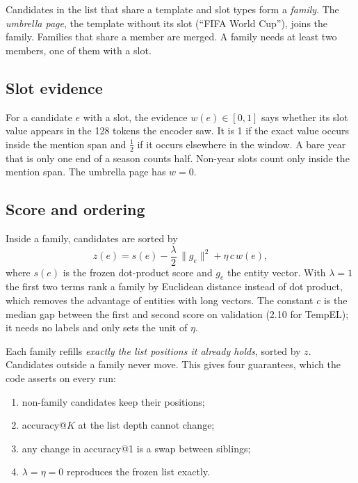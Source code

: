 \documentclass[conference]{IEEEtran}
\begin{document}
Candidates in the list that share a template and slot types form a \emph{family}. The \emph{umbrella
page}, the template without its slot (``FIFA World Cup''), joins the family. Families that share a
member are merged. A family needs at least two members, one of them with a slot.

\subsection{Slot evidence}

For a candidate $e$ with a slot, the evidence $w(e) \in [0,1]$ says whether its slot value appears in
the 128 tokens the encoder saw. It is 1 if the exact value occurs inside the mention span and
$\tfrac12$ if it occurs elsewhere in the window. A bare year that is only one end of a season counts
half. Non-year slots count only inside the mention span. The umbrella page has $w = 0$.

\subsection{Score and ordering}

Inside a family, candidates are sorted by
\begin{equation}
z(e) = s(e) - \frac{\lambda}{2}\,\lVert g_e \rVert^2 + \eta\, c\, w(e),
\label{eq:z}
\end{equation}
where $s(e)$ is the frozen dot-product score and $g_e$ the entity vector. With $\lambda = 1$ the first
two terms rank a family by Euclidean distance instead of dot product, which removes the advantage of
entities with long vectors. The constant $c$ is the median gap between the first and second score on
validation (2.10 for TempEL); it needs no labels and only sets the unit of $\eta$.

Each family refills \emph{exactly the list positions it already holds}, sorted by $z$. Candidates
outside a family never move. This gives four guarantees, which the code asserts on every run:
\begin{enumerate}
\item non-family candidates keep their positions;
\item accuracy@$K$ at the list depth cannot change;
\item any change in accuracy@1 is a swap between siblings;
\item $\lambda = \eta = 0$ reproduces the frozen list exactly.
\end{enumerate}
\end{document}
